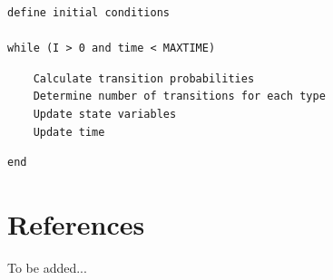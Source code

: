 \documentclass[margin,line,11pt]{article}
\begin{document}
\hfill\begin{minipage}{\dimexpr\textwidth-5cm}
\begin{verbatim}
define initial conditions

while (I > 0 and time < MAXTIME)
\end{verbatim}
\hfill\begin{minipage}{\dimexpr\textwidth-1cm}
\begin{verbatim}
	Calculate transition probabilities
	Determine number of transitions for each type
	Update state variables 
	Update time
\end{verbatim}
\end{minipage}
\begin{verbatim}
end
\end{verbatim}
\xdef\tpd{\the\prevdepth}
\end{minipage}
\vspace{0.5cm}

\section{References}

To be added...

\end{document}
